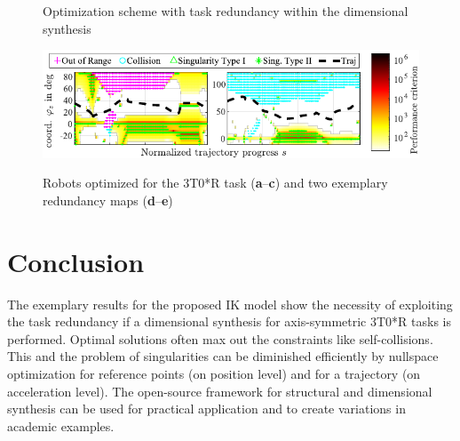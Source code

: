 \documentclass[
	graybox,
	vecphys] %
	{svmult}
\begin{document}
\begin{figure}[tb]
\centering

\caption{Optimization scheme with task redundancy within the dimensional synthesis}
\label{fig:optimization_flowchart_taskred}
\end{figure}



\begin{figure}[b]
\centering

\includegraphics{perfmap_1x2.pdf}
\label{fig:results_all}
\caption{Robots optimized for the 3T0*R task (\textbf{a}--\textbf{c}) and two exemplary redundancy maps (\textbf{d}--\textbf{e})}
\end{figure}


\section{Conclusion}
\label{sec:conclusion}


The exemplary results for the proposed IK model show the necessity of exploiting the task redundancy if a dimensional synthesis for axis-symmetric 3T0*R tasks is performed.
Optimal solutions often max out the constraints like self-collisions.
This and the problem of singularities can be diminished efficiently by nullspace optimization for reference points (on position level) and for a trajectory (on acceleration level).
The open-source framework for structural and dimensional synthesis can be used for practical application and to create variations in academic examples.
\end{document}

